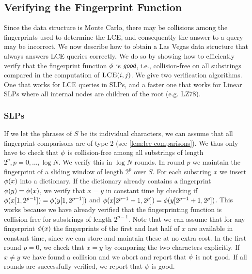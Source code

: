 

\subsection{Verifying the Fingerprint Function}
Since the data structure is Monte Carlo, there may be collisions among the fingerprints used to determine the LCE, and consequently the answer to a query may be incorrect. We now describe how to obtain a Las Vegas data structure that always answers LCE queries correctly. We do so by showing how to efficiently verify that the fingerprint function $\phi$ is $\emph{good}$, i.e., collision-free on all substrings compared in the computation of $\textsc{LCE}(i,j)$. We give two verification algorithms. One that works for LCE queries in SLPs, and a faster one that works for Linear SLPs where all internal nodes are children of the root (e.g. LZ78).


%


\subsubsection{SLPs}
If we let the phrases of $S$ be its individual characters, we can assume that all fingerprint comparisons are of type 2 (see \autoref{lem:lce-comparisons}). We thus only have to check that $\phi$ is collision-free among all substrings of length $2^p,p=0,\ldots,\log N$. We verify this in $\log N$ rounds. In round $p$ we maintain the fingerprint of a sliding window of length $2^p$ over $S$. For each substring $x$ we insert $\phi(x)$ into a dictionary. If the dictionary already contains a fingerprint $\phi(y)=\phi(x)$, we verify that $x=y$ in constant time by checking if $\phi(x[1,2^{p-1}]) = \phi(y[1,2^{p-1}])$ and $\phi(x[2^{p-1}+1,2^p]) = \phi(y[2^{p-1}+1,2^{p}])$. This works because we have already verified that the fingerprinting function is collision-free for substrings of length $2^{p-1}$. Note that we can assume that for any fingerprint $\phi(x)$ the fingerprints of the first and last half of $x$ are available in constant time, since we can store and maintain these at no extra cost. In the first round $p=0$, we check that $x=y$ by comparing the two characters explicitly. If $x \neq y$ we have found a collision and we abort and report that $\phi$ is not good. If all rounds are successfully verified, we report that $\phi$ is good.

